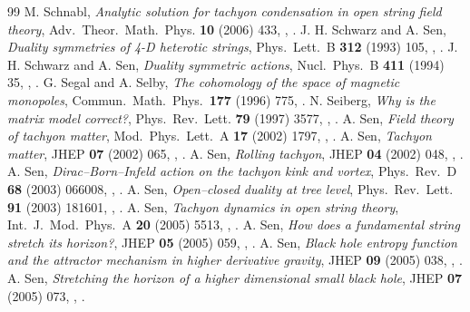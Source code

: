 \begin{thebibliography}{99}
 M. Schnabl, \emph{Analytic solution for tachyon condensation in open string field theory}, Adv.\ Theor.\ Math.\ Phys. \textbf{10} (2006) 433, , .
 J. H. Schwarz and A. Sen, \emph{Duality symmetries of 4-D heterotic strings}, Phys.\ Lett.\ B \textbf{312} (1993) 105, , .
 J. H. Schwarz and A. Sen, \emph{Duality symmetric actions}, Nucl.\ Phys.\ B \textbf{411} (1994) 35, , .
 G. Segal and A. Selby, \emph{The cohomology of the space of magnetic monopoles}, Commun.\ Math.\ Phys.\ \textbf{177} (1996) 775, .
 N. Seiberg, \emph{Why is the matrix model correct?}, Phys.\ Rev.\ Lett. \textbf{79} (1997) 3577, , .
 A. Sen, \emph{Field theory of tachyon matter}, Mod.\ Phys.\ Lett.\ A \textbf{17} (2002) 1797, , .
 A. Sen, \emph{Tachyon matter}, JHEP \textbf{07} (2002) 065, , .
 A. Sen, \emph{Rolling tachyon}, JHEP \textbf{04} (2002) 048, , .
 A. Sen, \emph{Dirac--Born--Infeld action on the tachyon kink and vortex}, Phys.\ Rev.\ D \textbf{68} (2003) 066008, , .
 A. Sen, \emph{Open--closed duality at tree level}, Phys.\ Rev.\ Lett. \textbf{91} (2003) 181601, , .
 A. Sen, \emph{Tachyon dynamics in open string theory}, Int.\ J.\ Mod.\ Phys.\ A \textbf{20} (2005) 5513, , .
 A. Sen, \emph{How does a fundamental string stretch its horizon?}, JHEP \textbf{05} (2005) 059, , .
 A. Sen, \emph{Black hole entropy function and the attractor mechanism in higher derivative gravity}, JHEP \textbf{09} (2005) 038, , .
 A. Sen, \emph{Stretching the horizon of a higher dimensional small black hole}, JHEP \textbf{07} (2005) 073, , .

\end{thebibliography}
